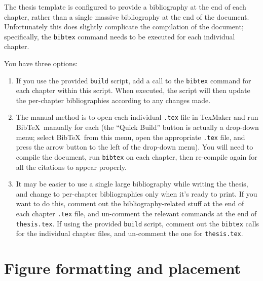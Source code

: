 The thesis template is configured to provide a bibliography at the end of each chapter, rather than a single massive bibliography at the end of the document. Unfortunately this does slightly complicate the compilation of the document; specifically, the \verb+bibtex+ command needs to be executed for each individual chapter.

You have three options:
%
\begin{enumerate}
\item If you use the provided \verb+build+ script, add a call to the \verb+bibtex+ command for each chapter within this script. When executed, the script will then update the per-chapter bibliographies according to any changes made.
\item The manual method is to open each individual \verb+.tex+ file in TexMaker and run Bib\TeX~manually for each (the ``Quick Build'' button is actually a drop-down menu; select Bib\TeX~from this menu, open the appropriate \verb+.tex+ file, and press the arrow button to the left of the drop-down menu). You will need to compile the document, run \verb+bibtex+ on each chapter, then re-compile again for all the citations to appear properly.
\item It may be easier to use a single large bibliography while writing the thesis, and change to per-chapter bibliographies only when it's ready to print. If you want to do this, comment out the bibliography-related stuff at the end of each chapter \verb+.tex+ file, and un-comment the relevant commands at the end of \verb+thesis.tex+. If using the provided \verb+build+ script, comment out the \verb+bibtex+ calls for the individual chapter files, and un-comment the one for \verb+thesis.tex+.
\end{enumerate}
%
%
\section{Figure formatting and placement}

